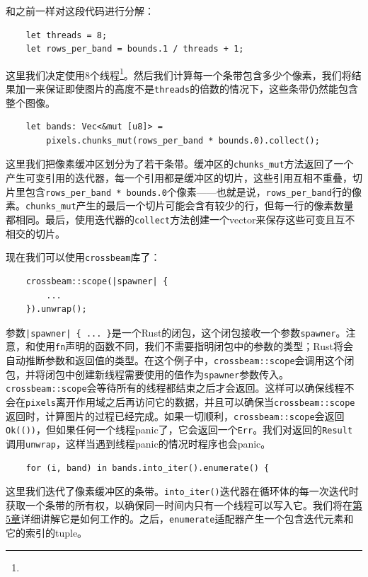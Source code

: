 和之前一样对这段代码进行分解：
\begin{verbatim}
    let threads = 8;
    let rows_per_band = bounds.1 / threads + 1;
\end{verbatim}

这里我们决定使用8个线程\footnote{}。然后我们计算每一个条带包含多少个像素，我们将结果加一来保证即使图片的高度不是\texttt{threads}的倍数的情况下，这些条带仍然能包含整个图像。

\begin{verbatim}
    let bands: Vec<&mut [u8]> =
        pixels.chunks_mut(rows_per_band * bounds.0).collect();
\end{verbatim}

这里我们把像素缓冲区划分为了若干条带。缓冲区的\texttt{chunks\_mut}方法返回了一个产生可变引用的迭代器，每一个引用都是缓冲区的切片，这些引用互相不重叠，切片里包含\texttt{rows\_per\_band * bounds.0}个像素——也就是说，\texttt{rows\_per\_band}行的像素。\texttt{chunks\_mut}产生的最后一个切片可能会含有较少的行，但每一行的像素数量都相同。最后，使用迭代器的\texttt{collect}方法创建一个vector来保存这些可变且互不相交的切片。

现在我们可以使用\texttt{crossbeam}库了：
\begin{verbatim}
    crossbeam::scope(|spawner| {
        ...
    }).unwrap();
\end{verbatim}
参数\texttt{|spawner| \{ ... \}}是一个Rust的闭包，这个闭包接收一个参数\texttt{spawner}。注意，和使用\texttt{fn}声明的函数不同，我们不需要指明闭包中的参数的类型；Rust将会自动推断参数和返回值的类型。在这个例子中，\texttt{crossbeam::scope}会调用这个闭包，并将闭包中创建新线程需要使用的值作为\texttt{spawner}参数传入。\texttt{crossbeam::scope}会等待所有的线程都结束之后才会返回。这样可以确保线程不会在\texttt{pixels}离开作用域之后再访问它的数据，并且可以确保当\texttt{crossbeam::scope}返回时，计算图片的过程已经完成。如果一切顺利，\texttt{crossbeam::scope}会返回\texttt{Ok(())}，但如果任何一个线程panic了，它会返回一个\texttt{Err}。我们对返回的\texttt{Result}调用\texttt{unwrap}，这样当遇到线程panic的情况时程序也会panic。

\begin{verbatim}
    for (i, band) in bands.into_iter().enumerate() {
\end{verbatim}
这里我们迭代了像素缓冲区的条带。\texttt{into\_iter()}迭代器在循环体的每一次迭代时获取一个条带的所有权，以确保同一时间内只有一个线程可以写入它。我们将在\hyperref[ch5]{第5章}详细讲解它是如何工作的。之后，\texttt{enumerate}适配器产生一个包含迭代元素和它的索引的tuple。

